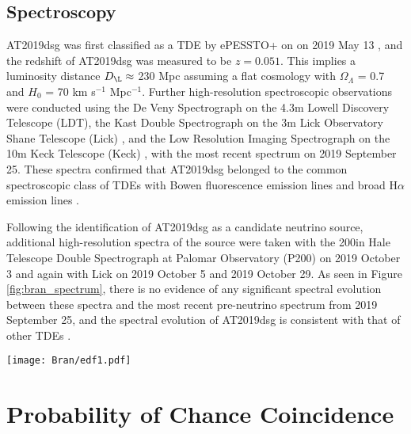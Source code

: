 \subsection*{Spectroscopy}

AT2019dsg was first classified as a TDE by ePESSTO+ on on 2019 May 13 , and the redshift of AT2019dsg was measured to be $z=0.051$. This implies a luminosity distance $D_{\L} \approx$ 230 Mpc assuming a flat cosmology with $\Omega_{\Lambda}$ = 0.7 and $H_{0}$ = 70 km s$^{-1}$ Mpc$^{-1}$.  Further high-resolution spectroscopic observations were conducted using the De Veny Spectrograph on the 4.3m Lowell Discovery Telescope (LDT), the Kast Double Spectrograph on the 3m Lick Observatory Shane Telescope (Lick) , and the Low Resolution Imaging Spectrograph on the 10m Keck Telescope (Keck) , with the most recent spectrum on 2019 September 25. These spectra confirmed that AT2019dsg belonged to the common spectroscopic class of TDEs with Bowen fluorescence emission lines and broad H$\alpha$ emission lines \cite{van_velzen_20}. 

Following the identification of AT2019dsg as a candidate neutrino source, additional high-resolution spectra of the source were taken with the 200in Hale Telescope Double Spectrograph at Palomar Observatory (P200) on 2019 October 3 and again with  Lick on 2019 October 5 and 2019 October 29. As seen in Figure \ref{fig:bran_spectrum}, there is no evidence of any significant spectral evolution between these spectra and the most recent pre-neutrino spectrum from 2019 September 25, and the spectral evolution of AT2019dsg is consistent with that of other TDEs \cite{van_velzen_20}. 

\begin{figure*}[h!]
	\centering \texttt{[image: Bran/edf1.pdf]}
	\caption{The spectroscopic evolution of AT2019dsg, beginning with the publicly available classification spectrum taken with the NTT \cite{2019ATel12752....1N}, and further spectra from LDT, Lick, Keck and P200. The Balmer lines are highlighted in cyan, the HeII lines in gray, and the Bowen fluorescence lines (OIII at 3760\AA, NIII at 4100\AA ~and 4640\AA) in black. Telluric lines are marked with +.}
	\label{fig:bran_spectrum}
\end{figure*}

\section{Probability of Chance Coincidence}

